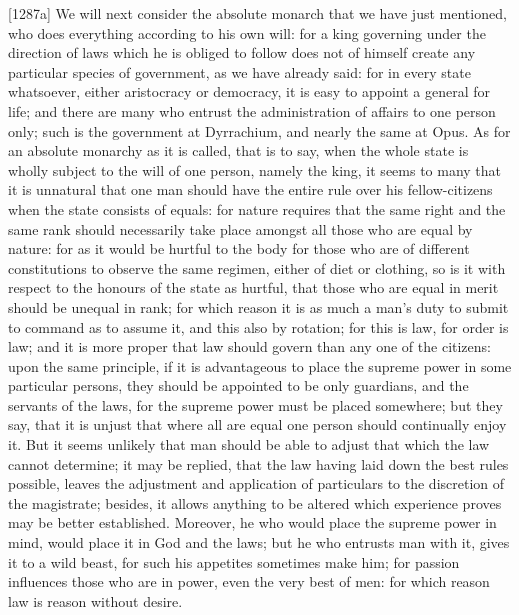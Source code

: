 
[1287a] We will next consider the absolute monarch that we have just
mentioned, who does everything according to his own will: for a king
governing under the direction of laws which he is obliged to follow does
not of himself create any particular species of government, as we have
already said: for in every state whatsoever, either aristocracy or
democracy, it is easy to appoint a general for life; and there are many
who entrust the administration of affairs to one person only; such is the
government at Dyrrachium, and nearly the same at Opus. As for an absolute
monarchy as it is called, that is to say, when the whole state is wholly
subject to the will of one person, namely the king, it seems to many that
it is unnatural that one man should have the entire rule over his
fellow-citizens when the state consists of equals: for nature requires
that the same right and the same rank should necessarily take place
amongst all those who are equal by nature: for as it would be hurtful to
the body for those who are of different constitutions to observe the same
regimen, either of diet or clothing, so is it with respect to the honours
of the state as hurtful, that those who are equal in merit should be
unequal in rank; for which reason it is as much a man's duty to submit to
command as to assume it, and this also by rotation; for this is law, for
order is law; and it is more proper that law should govern than any one of
the citizens: upon the same principle, if it is advantageous to place the
supreme power in some particular persons, they should be appointed to be
only guardians, and the servants of the laws, for the supreme power must
be placed somewhere; but they say, that it is unjust that where all are
equal one person should continually enjoy it. But it seems unlikely that
man should be able to adjust that which the law cannot determine; it may
be replied, that the law having laid down the best rules possible, leaves
the adjustment and application of particulars to the discretion of the
magistrate; besides, it allows anything to be altered which experience
proves may be better established. Moreover, he who would place the supreme
power in mind, would place it in God and the laws; but he who entrusts man
with it, gives it to a wild beast, for such his appetites sometimes make
him; for passion influences those who are in power, even the very best of
men: for which reason law is reason without desire.


